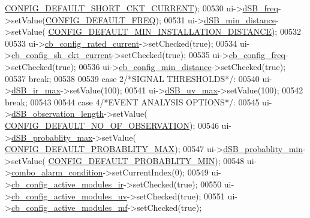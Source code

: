 \begin{DoxyCode}
      \hyperlink{a00086_a9b142f2e7d26511af74c411c0e524384}{CONFIG\_DEFAULT\_SHORT\_CKT\_CURRENT});
00530              ui->\hyperlink{a00080_abd528de839feccc001dc62b3aecddc9f}{dSB\_freq}->setValue(\hyperlink{a00086_a985a153b3edd3d7d638137ae0b9e5e67}{CONFIG\_DEFAULT\_FREQ});
00531              ui->\hyperlink{a00080_a01c23085590f4947828948bbd9f50cc7}{dSB\_min\_distance}->setValue(
      \hyperlink{a00086_aad4ef21bb535ed8bbba5a4f2d0451711}{CONFIG\_DEFAULT\_MIN\_INSTALLATION\_DISTANCE});
00532 
00533              ui->\hyperlink{a00080_af4863849ff58931ae3a38aa5b40b8158}{cb\_config\_rated\_current}->setChecked(\textcolor{keyword}{true});
00534              ui->\hyperlink{a00080_a541de6e510677e572ab233f7ecc25e2c}{cb\_config\_sh\_ckt\_current}->setChecked(\textcolor{keyword}{true});
00535              ui->\hyperlink{a00080_a8f501acefacd6343a4ec99a67172f256}{cb\_config\_freq}->setChecked(\textcolor{keyword}{true});
00536              ui->\hyperlink{a00080_a6b0d09f3b380fdb810d3da3f5208ccf5}{cb\_config\_min\_distance}->setChecked(\textcolor{keyword}{true});
00537         \textcolor{keywordflow}{break};
00538 
00539         \textcolor{keywordflow}{case} 2\textcolor{comment}{/*SIGNAL THRESHOLDS*/}:
00540             ui->\hyperlink{a00080_a220706f1fd93857145032c897e55d9e3}{dSB\_ir\_max}->setValue(100);
00541             ui->\hyperlink{a00080_aa2872ada374dace81c4f1cc41d8e244d}{dSB\_uv\_max}->setValue(100);
00542         \textcolor{keywordflow}{break};
00543 
00544         \textcolor{keywordflow}{case} 4\textcolor{comment}{/*EVENT ANALYSIS OPTIONS*/}:
00545             ui->\hyperlink{a00080_a1fe1bf902f2a365c4c94612d2a2ffbcc}{dSB\_observation\_length}->setValue(
      \hyperlink{a00086_af69b35a9f07bfcfe500538565d898c65}{CONFIG\_DEFAULT\_NO\_OF\_OBSERVATION});
00546             ui->\hyperlink{a00080_a137b79e810736643ac4b15e221909871}{dSB\_probablity\_max}->setValue(
      \hyperlink{a00086_a96cf926b530a1d5968881620d2f10445}{CONFIG\_DEFAULT\_PROBABLITY\_MAX});
00547             ui->\hyperlink{a00080_adfd6cf470c736f358c6982f9a635f04f}{dSB\_probablity\_min}->setValue(
      \hyperlink{a00086_a599be42d4b357badb7c9b16a124a186a}{CONFIG\_DEFAULT\_PROBABLITY\_MIN});
00548             ui->\hyperlink{a00080_a2af463e4a88fddd219f2e41a386fbd68}{combo\_alarm\_condition}->setCurrentIndex(0);
00549             ui->\hyperlink{a00080_abef4ef3d5d03026de5d5e172eb0335a6}{cb\_config\_active\_modules\_ir}->setChecked(\textcolor{keyword}{true});
00550             ui->\hyperlink{a00080_a72ad8a6b100948f9b1438cf3b949be5e}{cb\_config\_active\_modules\_uv}->setChecked(\textcolor{keyword}{true});
00551             ui->\hyperlink{a00080_abc96d02b5b7a9480a2a142008e99a100}{cb\_config\_active\_modules\_mf}->setChecked(\textcolor{keyword}{true});

\end{DoxyCode}
